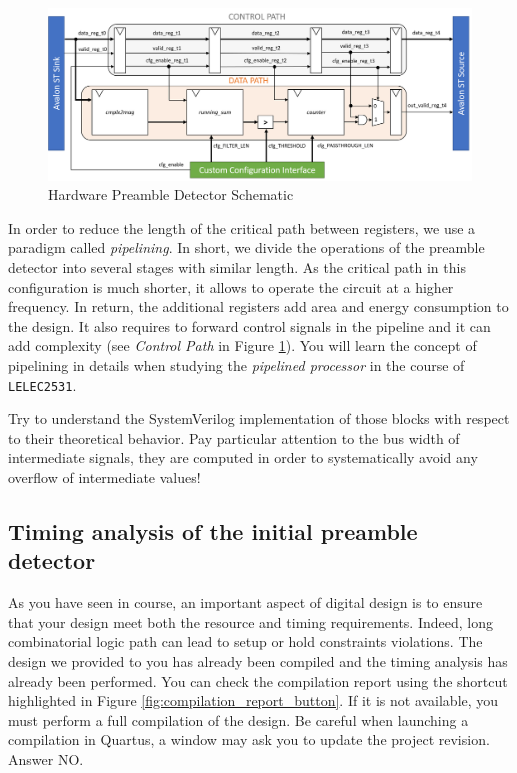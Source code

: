 \begin{figure}[!h]
    \centering
    \includegraphics[width=\linewidth]{figures/preamble_detect_block.png}
    \caption{Hardware Preamble Detector Schematic}
    \label{fig:pd_schematic}
\end{figure}

In order to reduce the length of the critical path between registers, we use a paradigm called \textit{pipelining}. In short, we divide the operations of the preamble detector into several stages with similar length. As the critical path in this configuration is much shorter, it allows to operate the circuit at a higher frequency. In return, the additional registers add area and energy consumption to the design. It also requires to forward control signals in the pipeline and it can add complexity (see \textit{Control Path} in Figure \ref{fig:pd_schematic}). You will learn the concept of pipelining in details when studying the \textit{pipelined processor} in the course of \texttt{LELEC2531}.

Try to understand the SystemVerilog implementation of those blocks with respect to their theoretical behavior. Pay particular attention to the bus width of intermediate signals, they are computed in order to systematically avoid any overflow of intermediate values!


\subsection{Timing analysis of the initial preamble detector}

As you have seen in course, an important aspect of digital design is to ensure that your design meet both the resource and timing requirements. Indeed, long combinatorial logic path can lead to setup or hold constraints violations. The design we provided to you has already been compiled and the timing analysis has already been performed. You can check the compilation report using the shortcut highlighted in Figure \ref{fig:compilation_report_button}. If it is not available, you must perform a full compilation of the design. Be careful when launching a compilation in Quartus, a window may ask you to update the project revision. Answer NO.

